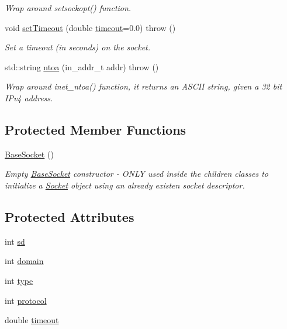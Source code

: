 \begin{CompactItemize}
\begin{CompactList}\small\item\em Wrap around setsockopt() function. \item\end{CompactList}\item 
void \hyperlink{classusock_1_1BaseSocket_e31552b42df68bc68fe557caf6e75128}{setTimeout} (double \hyperlink{classusock_1_1BaseSocket_b419e8fd0b849c74b73a02d6bd9081e3}{timeout}=0.0)  throw ()
\begin{CompactList}\small\item\em Set a timeout (in seconds) on the socket. \item\end{CompactList}\item 
std::string \hyperlink{classusock_1_1BaseSocket_3da108b8c23df3b521ded0bc4ae5295c}{ntoa} (in\_\-addr\_\-t addr)  throw ()
\begin{CompactList}\small\item\em Wrap around inet\_\-ntoa() function, it returns an ASCII string, given a 32 bit IPv4 address. \item\end{CompactList}\end{CompactItemize}
\subsection*{Protected Member Functions}
\begin{CompactItemize}
\item 
\hyperlink{classusock_1_1BaseSocket_20f598433d6c3a97656f0179f7371218}{BaseSocket} ()
\begin{CompactList}\small\item\em Empty \hyperlink{classusock_1_1BaseSocket}{BaseSocket} constructor - ONLY used inside the children classes to initialize a \hyperlink{classusock_1_1Socket}{Socket} object using an already existen socket descriptor. \item\end{CompactList}\end{CompactItemize}
\subsection*{Protected Attributes}
\begin{CompactItemize}
\item 
int \hyperlink{classusock_1_1BaseSocket_63b6c07fb14f937056148cbf8b3531c5}{sd}
\item 
int \hyperlink{classusock_1_1BaseSocket_9a7414d934aeccd1340292214a2aef0e}{domain}
\item 
int \hyperlink{classusock_1_1BaseSocket_139a74d163977332762f349a73f4bd64}{type}
\item 
int \hyperlink{classusock_1_1BaseSocket_91b9f72f183b6314891f7e1f93ead99a}{protocol}
\item 
double \hyperlink{classusock_1_1BaseSocket_b419e8fd0b849c74b73a02d6bd9081e3}{timeout}
\end{CompactItemize}


